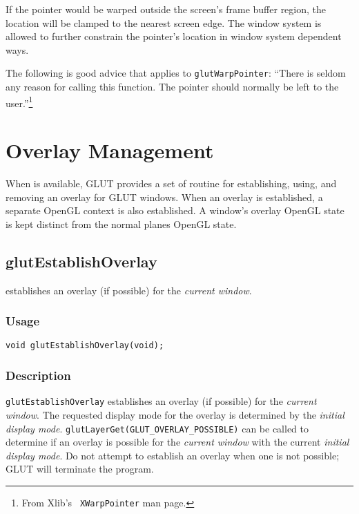 If the pointer would be warped outside the screen's frame buffer
region, the location will be clamped to the nearest screen edge.  The
window system is allowed to further constrain the pointer's location in
window system dependent ways.

The following is good advice that applies to {\tt glutWarpPointer}:
``There is seldom any reason for calling this function. The pointer
should normally be left to the user.''\footnote{From Xlib's {\tt
XWarpPointer} man page.}

\section{Overlay Management}

When  is available, GLUT provides a set of routine for
establishing, using, and removing an overlay for GLUT windows.
When an overlay is established, a separate OpenGL context is also
established.  A window's overlay OpenGL state is kept 
distinct from the normal planes OpenGL state.

\subsection{glutEstablishOverlay}

 establishes an overlay (if possible) for
the {\em current window}.

\subsubsection*{Usage}

\begin{verbatim}
void glutEstablishOverlay(void);
\end{verbatim}

\subsubsection*{Description}

{\tt glutEstablishOverlay} establishes an overlay (if possible) for
the {\em current window}.  The requested display mode for the overlay is 
determined by the {\em initial display mode}.
{\tt glutLayerGet(GLUT\_OVERLAY\_POSSIBLE)} can be called to determine
if an overlay is possible for the {\em current window} with the
current {\em initial display mode}.  Do not attempt to establish an
overlay when one is not possible; GLUT will terminate the program.


